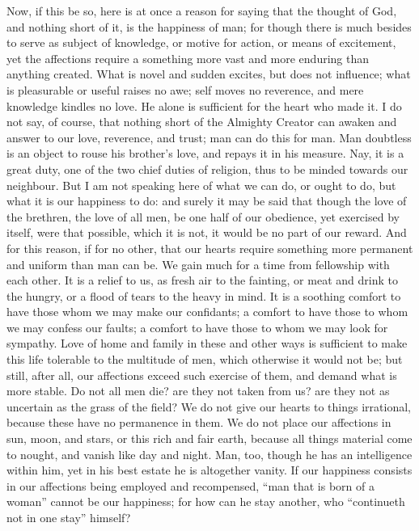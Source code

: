 Now, if this be so, here is at once a reason for saying that the
thought of God, and nothing short of it, is the happiness of man; for
though there is much besides to serve as subject of knowledge, or
motive for action, or means of excitement, yet the affections require
a something more vast and more enduring than anything created. What is
novel and sudden excites, but does not influence; what is pleasurable
or useful raises no awe; self moves no reverence, and mere knowledge
kindles no love. He alone is sufficient for the heart who made it. I
do not say, of course, that nothing short of the Almighty Creator can
awaken and answer to our love, reverence, and trust; man can do this
for man. Man doubtless is an object to rouse his brother's love, and
repays it in his measure. Nay, it is a great duty, one of the two
chief duties of religion, thus to be minded towards our neighbour. But
I am not speaking here of what we can do, or ought to do, but what it
is our happiness to do: and surely it may be said that though the love
of the brethren, the love of all men, be one half of our obedience,
yet exercised by itself, were that possible, which it is not, it would
be no part of our reward. And for this reason, if for no other, that
our hearts require something more permanent and uniform than man can
be. We gain much for a time from fellowship with each other. It is a
relief to us, as fresh air to the fainting, or meat and drink to the
hungry, or a flood of tears to the heavy in mind. It is a soothing
comfort to have those whom we may make our confidants; a comfort to
have those to whom we may confess our faults; a comfort to have those
to whom we may look for sympathy. Love of home and family in these and
other ways is sufficient to make this life tolerable to the multitude
of men, which otherwise it would not be; but still, after all, our
affections exceed such exercise of them, and demand what is more
stable. Do not all men die? are they not taken from us? are they not
as uncertain as the grass of the field? We do not give our hearts to
things irrational, because these have no permanence in them. We do not
place our affections in sun, moon, and stars, or this rich and fair
earth, because all things material come to nought, and vanish like day
and night. Man, too, though he has an intelligence within him, yet in
his best estate he is altogether vanity. If our happiness consists in
our affections being employed and recompensed, ``man that is born
of a woman'' cannot be our happiness; for how can he stay another,
who ``continueth not in one stay'' himself?

